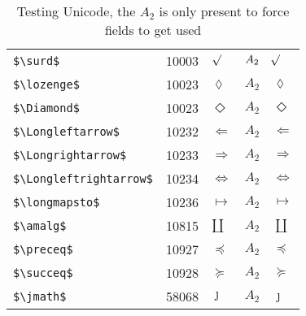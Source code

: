 \documentclass{article}
\begin{document}
\begin{table}
\begin{center}
\begin{tabular}{llll}
 \verb#$\surd$#               & 10003   & $\surd$               & $A_2\quad \surd$\\
 \verb#$\lozenge$#            & 10023   & $\lozenge$            & $A_2\quad \lozenge$\\
 \verb#$\Diamond$#            & 10023   & $\Diamond$            & $A_2\quad \Diamond$\\
 \verb#$\Longleftarrow$#      & 10232   & $\Longleftarrow$      & $A_2\quad \Longleftarrow$\\
 \verb#$\Longrightarrow$#     & 10233   & $\Longrightarrow$     & $A_2\quad \Longrightarrow$\\
 \verb#$\Longleftrightarrow$# & 10234   & $\Longleftrightarrow$ & $A_2\quad \Longleftrightarrow$\\
 \verb#$\longmapsto$#         & 10236   & $\longmapsto$         & $A_2\quad \longmapsto$\\
 \verb#$\amalg$#              & 10815   & $\amalg$              & $A_2\quad \amalg$\\
 \verb#$\preceq$#             & 10927   & $\preceq$             & $A_2\quad \preceq$\\
 \verb#$\succeq$#             & 10928   & $\succeq$             & $A_2\quad \succeq$\\
 \verb#$\jmath$#              & 58068   & $\jmath$              & $A_2\quad \jmath$\\
\end{tabular}
\end{center}
\caption{Testing Unicode, the $A_2$ is only present to force fields to get used}
\end{table}
\end{document}
